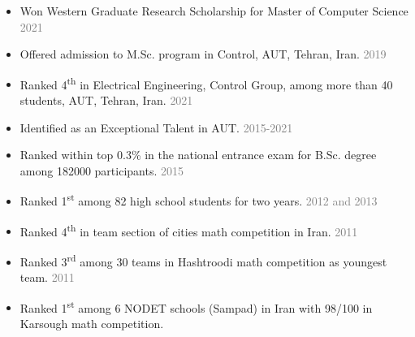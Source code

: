 \documentclass[10pt,a4paper,sans]{moderncv} %
\begin{document}
	\begin{itemize}
	    \item Won Western Graduate Research Scholarship for Master of Computer Science \hfill \textcolor{gray}{2021}
	    
		\item Offered admission to M.Sc. program in Control, AUT, Tehran, Iran. \hfill \textcolor{gray}{2019} 
			
		\item Ranked 4\textsuperscript{th} in Electrical Engineering, Control Group, among more than 40 students,
		AUT, Tehran, Iran. \hfill \textcolor{gray}{2021}

		\item Identified as an Exceptional Talent in AUT. \hfill \textcolor{gray}{2015-2021}
		
		\item Ranked within top 0.3\% in the national entrance exam for B.Sc. degree among 182000 participants. \hfill \textcolor{gray}{2015}
		
		\item Ranked 1\textsuperscript{st} among 82 high school students for two years. \hfill \textcolor{gray}{2012 and 2013}

		\item Ranked 4\textsuperscript{th} in team section of cities math competition  in Iran. \hfill \textcolor{gray}{2011}	

		\item Ranked 3\textsuperscript{rd} among 30 teams in Hashtroodi math competition  as youngest team. \hfill \textcolor{gray}{2011}		

		\item Ranked 1\textsuperscript{st} among 6 NODET schools (Sampad) in Iran with 98/100 in Karsough math competition.

	\end{itemize}
	
	
	
	\vspace{-0.5 em}
	
\end{document}
